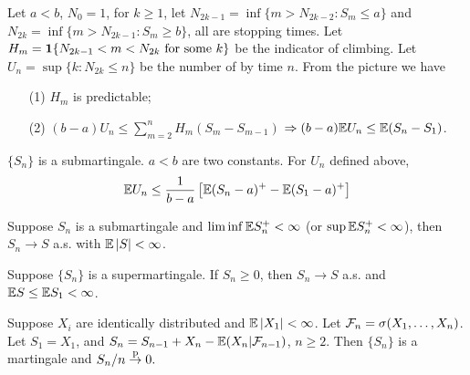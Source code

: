 \documentclass[10pt,a4paper]{article}
\begin{document}
Let $a<b$, $N_0=1$, for $k\geq 1$, let $N_{2k-1}=\inf\{m>N_{2k-2}: S_m\leq a\}$ and $N_{2k}=\inf\{m>N_{2k-1}: S_m\geq b\}$, all are stopping times. Let $H_m={\boldsymbol 1}\{N_{2k-1}<m<N_{2k}\text{ for some } k\}$ be the indicator of climbing. Let $U_n=\sup\{k:N_{2k}\leq n\}$ be the number of  by time $n$. From the picture we have 
\begin{enumerate}
	\item[(1)] $H_m$ is predictable;
	\item[(2)] $(b-a) U_n \leq \sum_{m=2}^{n}H_m(S_m-S_{m-1})$ $\Rightarrow (b-a)\mathbb E U_n\leq \mathbb E(S_n-S_1)$.   
\end{enumerate} 
\begin{thmbox}
	\begin{theorem}\label{thm:upcrossings_ineq}\rm
		$\{S_n\}$ is a submartingale. $a<b$ are two constants. For $U_n$ defined above,
		{\setlength\abovedisplayskip{0.15cm}
			\setlength\belowdisplayskip{0.15cm}
			\begin{equation*}
				\mathbb E U_n\leq \frac{1}{b-a}\left[ {
					\mathbb E(S_n-a)^+ - \mathbb E(S_1-a)^+
				}\right]
			\end{equation*}}     
	\end{theorem}
\end{thmbox}

\begin{thmbox}
	\begin{theorem}\label{thm:martingale_cvg}\rm
		Suppose $S_n$ is a submartingale and $\liminf \mathbb E S_n^+<\infty $ (or $\sup \mathbb E S_n^+<\infty $), then $S_n\to S$ a.s. with $\mathbb E\left\lvert S\right\rvert<\infty $.   
	\end{theorem}
	\begin{theorem}\label{thm:martingale_cvg_super}\rm
		Suppose $\{S_n\}$ is a supermartingale. If $S_n\geq 0$, then $S_n\to S$ a.s. and $\mathbb E S\leq\mathbb E S_1 <\infty $.    
	\end{theorem}
	\begin{corollary}\label{cor:WLLN_mart}\rm
		Suppose $X_i$ are identically distributed and $\mathbb E\left\lvert X_1\right\rvert<\infty $. Let ${\cal F}_n=\sigma(X_1,\ldots,X_n)$. Let $S_1=X_1$, and $S_n=S_{n-1}+X_n-\mathbb E(X_n|{\cal F}_{n-1})$, $n\geq 2$. Then $\{S_n\}$ is a martingale and ${S_n}/{n} \stackrel{\mathrm{p}}{\to} 0.$       
	\end{corollary}
\end{thmbox}
\end{document}
